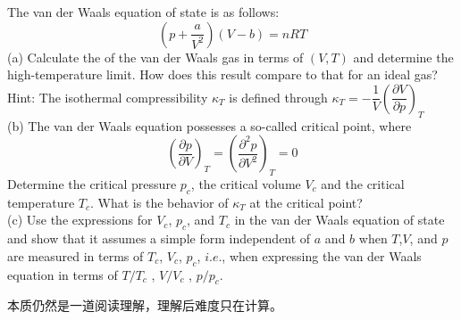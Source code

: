 \begin{solution}
    The van der Waals equation of state is as follows:
    \begin{equation*}
        (p+\frac{a}{V^{2}})(V-b)=nRT
    \end{equation*}
    (a) Calculate the  of the van der Waals gas in terms of $(V,T)$ and
    determine the high-temperature limit. How does this result compare to that for an ideal gas?\\
    Hint: The isothermal compressibility $\kappa_T$ is defined through $\kappa_{T}=-\dfrac{1}{V}\left(\dfrac{\partial V}{\partial p}\right)_{T}$\\
    (b) The van der Waals equation possesses a so-called critical point, where
    \begin{equation*}
        \left(\frac{\partial p}{\partial V}\right)_{T} = \left(\frac{\partial^{2} p}{\partial V^{2}}\right)_{T} = 0
    \end{equation*}
    Determine the critical pressure $p_c$, the critical volume $V_c$ and the critical temperature $T_c$. What
    is the behavior of $\kappa_T$ at the critical point?\\
    (c) Use the expressions for $V_c$, $p_c$, and $T_c$ in the van der Waals equation of state and show that it
    assumes a simple form independent of $a$ and $b$ when $T$,$V$, and $p$ are measured in terms of $T_c$,
    $V_c$, $p_c$, $i.e.$, when expressing the van der Waals equation in terms of $T/T_c$ , $V/V_c$ , $p/p_c$.

    \tcbrule

    本质仍然是一道阅读理解，理解后难度只在计算。


\end{solution}

